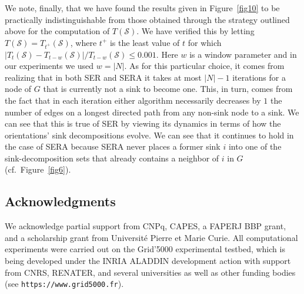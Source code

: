 \documentclass{article}
\begin{document}
We note, finally, that we have found the results given in Figure~\ref{fig10}
to be practically indistinguishable from those obtained through the strategy
outlined above for the computation of $T(\mathcal{S})$. We have verified this by
letting $T(\mathcal{S})=T_{t^+}(\mathcal{S})$, where $t^+$ is the least value of
$t$ for which
$\vert T_t(\mathcal{S})-T_{t-w}(\mathcal{S})\vert/T_{t-w}(\mathcal{S})\le 0.001$.
Here $w$ is a window parameter and in our experiments we used $w=\vert N\vert$.
As for this particular choice, it comes from realizing that in both SER and SERA
it takes at most $\vert N\vert-1$ iterations for a node of $G$ that is currently
not a sink to become one. This, in turn, comes from the fact that in each
iteration either algorithm necessarily decreases by $1$ the number of edges on a
longest directed path from any non-sink node to a sink. We can see that this is
true of SER by viewing its dynamics in terms of how the orientations' sink
decompositions evolve. We can see that it continues to hold in the case of SERA
because SERA never places a former sink $i$ into one of the sink-decomposition
sets that already contains a neighbor of $i$ in $G$ (cf.\ Figure~\ref{fig6}).

\subsection*{Acknowledgments}

We acknowledge partial support from CNPq, CAPES, a FAPERJ BBP grant, and a
scholarship grant from Universit\'{e} Pierre et Marie Curie.
All computational experiments were carried out on the Grid'5000 experimental
testbed, which is being developed under the INRIA ALADDIN development action
with support from CNRS, RENATER, and several universities as well as other
funding bodies (see \texttt{https://www.grid5000.fr}).



\end{document}
